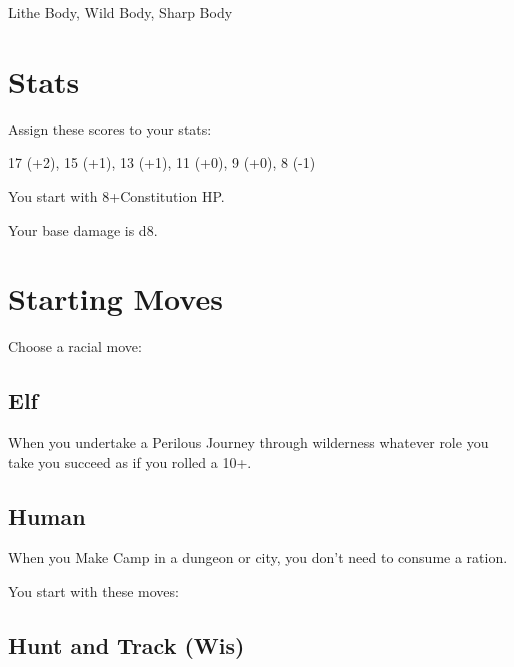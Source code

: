          

Lithe Body, Wild Body, Sharp Body

       

       
\section{Stats}   
       

         

Assign these scores to your stats:

         

17 (+2), 15 (+1), 13 (+1), 11 (+0), 9 (+0), 8 (-1)

         

You start with 8+Constitution HP.

       

       

Your base damage is d8.

       
\section{Starting Moves}   
       

         
\startInstructionsAfterHeader
Choose a racial move:
\stopInstructionsAfterHeader
         

           
\subsection{Elf}   
           

When you undertake a Perilous Journey through wilderness whatever role you take you succeed as if you rolled a 10+.

           
\subsection{Human}   
           

When you Make Camp in a dungeon or city, you don't need to consume a ration.

         

         

           
\startInstructions
You start with these moves:
\stopInstructions
           
\subsection{Hunt and Track (Wis)}     
           

